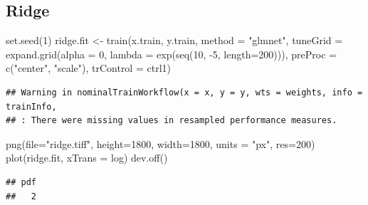 \documentclass[
]{article}
\newenvironment{Shaded}{\begin{snugshade}}{\end{snugshade}}
\newcommand{\AttributeTok}[1]{\textcolor[rgb]{0.77,0.63,0.00}{#1}}
\newcommand{\DecValTok}[1]{\textcolor[rgb]{0.00,0.00,0.81}{#1}}
\newcommand{\FunctionTok}[1]{\textcolor[rgb]{0.00,0.00,0.00}{#1}}
\newcommand{\NormalTok}[1]{#1}
\newcommand{\OtherTok}[1]{\textcolor[rgb]{0.56,0.35,0.01}{#1}}
\newcommand{\SpecialCharTok}[1]{\textcolor[rgb]{0.00,0.00,0.00}{#1}}
\newcommand{\StringTok}[1]{\textcolor[rgb]{0.31,0.60,0.02}{#1}}
\begin{document}
\hypertarget{ridge}{%
\subsection{Ridge}\label{ridge}}

\begin{Shaded}
\begin{Highlighting}[]
\FunctionTok{set.seed}\NormalTok{(}\DecValTok{1}\NormalTok{)}
\NormalTok{ridge.fit }\OtherTok{\textless{}{-}} \FunctionTok{train}\NormalTok{(x.train, y.train,}
                   \AttributeTok{method =} \StringTok{"glmnet"}\NormalTok{,}
                   \AttributeTok{tuneGrid =} \FunctionTok{expand.grid}\NormalTok{(}\AttributeTok{alpha =} \DecValTok{0}\NormalTok{, }
                                          \AttributeTok{lambda =} \FunctionTok{exp}\NormalTok{(}\FunctionTok{seq}\NormalTok{(}\DecValTok{10}\NormalTok{, }\SpecialCharTok{{-}}\DecValTok{5}\NormalTok{, }\AttributeTok{length=}\DecValTok{200}\NormalTok{))),}
                   \AttributeTok{preProc =} \FunctionTok{c}\NormalTok{(}\StringTok{"center"}\NormalTok{, }\StringTok{"scale"}\NormalTok{),}
                   \AttributeTok{trControl =}\NormalTok{ ctrl1)}
\end{Highlighting}
\end{Shaded}

\begin{verbatim}
## Warning in nominalTrainWorkflow(x = x, y = y, wts = weights, info = trainInfo,
## : There were missing values in resampled performance measures.
\end{verbatim}

\begin{Shaded}
\begin{Highlighting}[]
\FunctionTok{png}\NormalTok{(}\AttributeTok{file=}\StringTok{"ridge.tiff"}\NormalTok{, }\AttributeTok{height=}\DecValTok{1800}\NormalTok{, }\AttributeTok{width=}\DecValTok{1800}\NormalTok{, }\AttributeTok{units =} \StringTok{"px"}\NormalTok{, }\AttributeTok{res=}\DecValTok{200}\NormalTok{)}
\FunctionTok{plot}\NormalTok{(ridge.fit, }\AttributeTok{xTrans =}\NormalTok{ log)}
\FunctionTok{dev.off}\NormalTok{()}
\end{Highlighting}
\end{Shaded}

\begin{verbatim}
## pdf 
##   2
\end{verbatim}

\begin{Shaded}
\end{Shaded}
\end{document}
